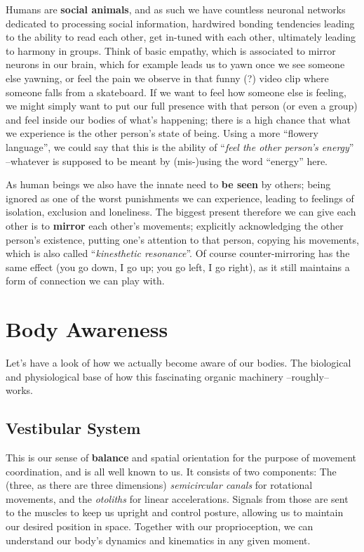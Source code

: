Humans are \textbf{social animals}, and as such we have countless neuronal networks dedicated to processing social information, hardwired bonding tendencies leading to the ability to read each other, get in-tuned with each other, ultimately leading to harmony in groups.
Think of basic empathy, which is associated to mirror neurons in our brain, which for example leads us to yawn once we see someone else yawning, or feel the pain we observe in that funny (?) video clip where someone falls from a skateboard.
If we want to feel how someone else is feeling, we might simply want to put our full presence with that person (or even a group) and feel inside our bodies of what's happening; there is a high chance that what we experience is the other person's state of being.
Using a more ``flowery language'', we could say that this is the ability of ``\textit{feel the other person's energy}'' --whatever is supposed to be meant by (mis-)using the word ``energy'' here.

As human beings we also have the innate need to \textbf{be seen} by others; being ignored as one of the worst punishments we can experience, leading to feelings of isolation, exclusion and loneliness.
The biggest present therefore we can give each other is to \textbf{mirror} each other's movements; explicitly acknowledging the other person's existence, putting one's attention to that person, copying his movements, which is also called ``\textit{kinesthetic resonance}''.
Of course counter-mirroring has the same effect (you go down, I go up; you go left, I go right), as it still maintains a form of connection we can play with.

\section{Body Awareness}\label{sec:body-awareness}

Let's have a look of how we actually become aware of our bodies.
The biological and physiological base of how this fascinating organic machinery --roughly-- works.

\subsection{Vestibular System}\label{subsec:vestibular-system}

This is our sense of \textbf{balance} and spatial orientation for the purpose of movement coordination, and is all well known to us.
It consists of two components: The (three, as there are three dimensions) \textit{semicircular canals} for rotational movements, and the \textit{otoliths} for linear accelerations.
Signals from those are sent to the muscles to keep us upright and control posture, allowing us to maintain our desired position in space.
Together with our proprioception, we can understand our body's dynamics and kinematics in any given moment.


